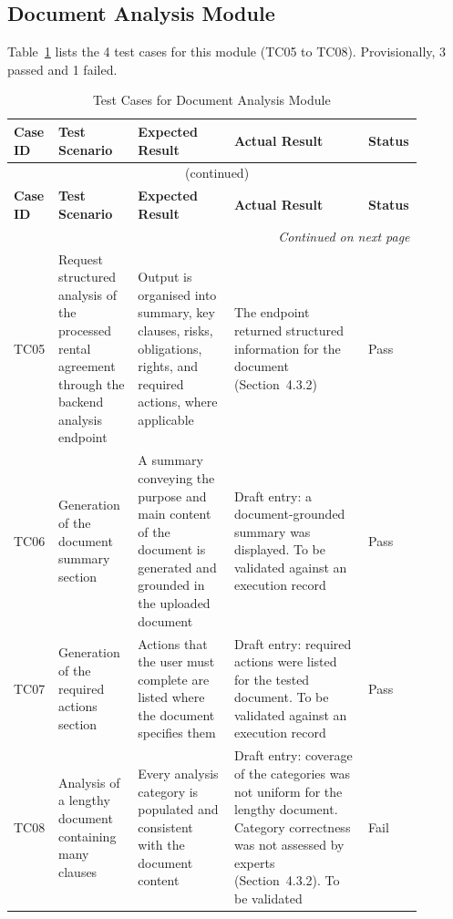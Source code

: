 \documentclass[12pt,a4paper,oneside]{report}
\begin{document}
\subsection{Document Analysis Module}
Table~\ref{tab:analysis} lists the 4 test cases for this module (TC05 to TC08). Provisionally, 3 passed and 1 failed.
{\footnotesize
\setlength{\tabcolsep}{3pt}
\renewcommand{\arraystretch}{1.15}
\begin{longtable}{|p{0.075\linewidth}|p{0.19\linewidth}|p{0.23\linewidth}|p{0.32\linewidth}|p{0.08\linewidth}|}
\caption{Test Cases for Document Analysis Module}\label{tab:analysis}\\
\hline
\textbf{Case ID} & \textbf{Test Scenario} & \textbf{Expected Result} & \textbf{Actual Result} & \textbf{Status}\\
\hline
\endfirsthead
\multicolumn{5}{c}{\tablename~\thetable{} (continued)}\\
\hline
\textbf{Case ID} & \textbf{Test Scenario} & \textbf{Expected Result} & \textbf{Actual Result} & \textbf{Status}\\
\hline
\endhead
\hline
\multicolumn{5}{r}{\emph{Continued on next page}}\\
\endfoot
\hline
\endlastfoot
TC05 & Request structured analysis of the processed rental agreement through the backend analysis endpoint & Output is organised into summary, key clauses, risks, obligations, rights, and required actions, where applicable & The endpoint returned structured information for the document (Section~4.3.2) & Pass\\
\hline
TC06 & Generation of the document summary section & A summary conveying the purpose and main content of the document is generated and grounded in the uploaded document & Draft entry: a document-grounded summary was displayed. To be validated against an execution record & Pass\\
\hline
TC07 & Generation of the required actions section & Actions that the user must complete are listed where the document specifies them & Draft entry: required actions were listed for the tested document. To be validated against an execution record & Pass\\
\hline
TC08 & Analysis of a lengthy document containing many clauses & Every analysis category is populated and consistent with the document content & Draft entry: coverage of the categories was not uniform for the lengthy document. Category correctness was not assessed by experts (Section~4.3.2). To be validated & Fail\\
\end{longtable}
}
\end{document}

